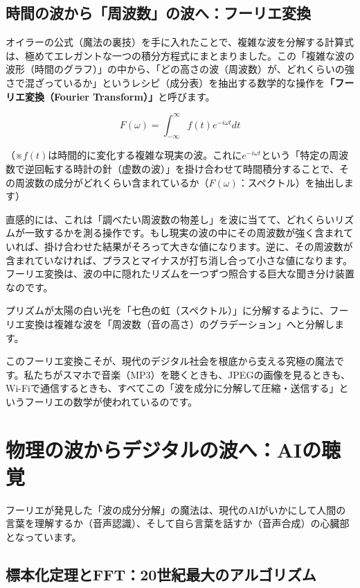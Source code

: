 \subsection{時間の波から「周波数」の波へ：フーリエ変換}

オイラーの公式（魔法の裏技）を手に入れたことで、複雑な波を分解する計算式は、極めてエレガントな一つの積分方程式にまとまりました。この「複雑な波の波形（時間のグラフ）」の中から、「どの高さの波（周波数）が、どれくらいの強さで混ざっているか」というレシピ（成分表）を抽出する数学的な操作を\textbf{「フーリエ変換（Fourier Transform）」}と呼びます。

\[F(\omega) = \int_{-\infty}^{\infty} f(t) e^{-i\omega t} dt\]

（※\(f(t)\)は時間的に変化する複雑な現実の波。これに\(e^{-i\omega t}\)という「特定の周波数で逆回転する時計の針（虚数の波）」を掛け合わせて時間積分することで、その周波数の成分がどれくらい含まれているか（\(F(\omega)\)：スペクトル）を抽出します）

直感的には、これは「調べたい周波数の物差し」を波に当てて、どれくらいリズムが一致するかを測る操作です。もし現実の波の中にその周波数が強く含まれていれば、掛け合わせた結果がそろって大きな値になります。逆に、その周波数が含まれていなければ、プラスとマイナスが打ち消し合って小さな値になります。フーリエ変換は、波の中に隠れたリズムを一つずつ照合する巨大な聞き分け装置なのです。

プリズムが太陽の白い光を「七色の虹（スペクトル）」に分解するように、フーリエ変換は複雑な波を「周波数（音の高さ）のグラデーション」へと分解します。

このフーリエ変換こそが、現代のデジタル社会を根底から支える究極の魔法です。私たちがスマホで音楽（MP3）を聴くときも、JPEGの画像を見るときも、Wi-Fiで通信するときも、すべてこの「波を成分に分解して圧縮・送信する」というフーリエの数学が使われているのです。

\section{物理の波からデジタルの波へ：AIの聴覚}

フーリエが発見した「波の成分分解」の魔法は、現代のAIがいかにして人間の言葉を理解するか（音声認識）、そして自ら言葉を話すか（音声合成）の心臓部となっています。

\subsection{標本化定理とFFT：20世紀最大のアルゴリズム}


